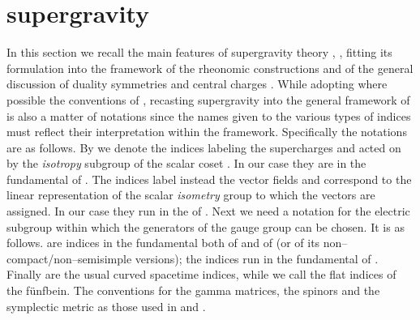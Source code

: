\documentclass[a4paper,12pt]{article}
\begin{document}
\section{\coordHE{} supergravity}
In this section we recall the main features of
\coordHE{} supergravity theory \cite{gunwar},
\cite{PPV}, fitting its formulation into the framework of the
rheonomic constructions \cite{castdauriafre} and of the general
discussion of duality symmetries \cite{mylecture} and central
charges \cite{Andrianopoli:1997wf}. While adopting where possible
the conventions of \cite{gunwar}, recasting  \coordHE{}
supergravity into the general framework of
\cite{Andrianopoli:1997wf} is also a matter of notations since the
names given to the various types of indices must reflect their
interpretation within the framework. Specifically the notations
are as follows. By \coordHE{} we denote the indices labeling
the supercharges and acted on by the {\it isotropy} subgroup \coordHE{}
of the scalar coset \coordHE{}. In our case they are in the fundamental
\coordHE{} of \coordHE{}. The indices
\coordHE{}  label instead the vector fields and
correspond to the linear representation of the scalar {\it
isometry} group \coordHE{} to which the vectors are assigned. In our case
they run in the \coordHE{} of \coordHE{}. Next we need a
notation for the electric subgroup \coordHE{} within
which the generators of the gauge group can be chosen. It is as
follows. \coordHE{} are indices in the fundamental  \coordHE{}
both of \coordHE{} and
of \coordHE{} (or of its non--compact/non--semisimple
versions); the indices \coordHE{} run in the fundamental
\coordHE{} of \coordHE{}.
Finally \coordHE{} are the usual curved spacetime
indices, while  we call \coordHE{} the flat indices of the
f\"unfbein. The conventions for the gamma matrices, the spinors
and the symplectic metric as those used in \cite{gunwar} and
\cite{cremmer}.
\end{document}
